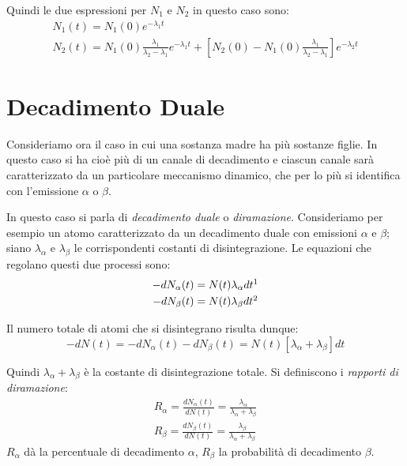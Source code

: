 Quindi le due espressioni per $N_1$ e $N_2$ in questo caso sono:
\begin{gather}
N_1(t)=N_1(0)e^{-\lambda_1t}\\
N_2(t)=N_1(0)\frac{\lambda_1}{\lambda_2-\lambda_1}e^{-\lambda_1t}+[N_2(0)-N_1(0)\frac{\lambda_1}{\lambda_2-\lambda_1}]e^{-\lambda_2t}
\end{gather}
\section{Decadimento Duale}
Consideriamo ora il caso in cui una sostanza madre ha più sostanze figlie.
In questo caso si ha cioè più di un canale di decadimento e ciascun canale sarà caratterizzato da un particolare meccanismo dinamico,
che per lo più si identifica con l'emissione $\alpha$ o $\beta$.

In questo caso si parla di \textit{decadimento duale} o \textit{diramazione}.
Consideriamo per esempio un atomo caratterizzato da un decadimento duale con emissioni $\alpha$ e $\beta$;
siano $\lambda_{\alpha}$ e $\lambda_{\beta}$ le corrispondenti costanti di disintegrazione.
Le equazioni che regolano questi due processi sono:
\begin{gather}
-dN_{\alpha}(t)=N(t)\lambda_{\alpha}dt\footnotemark\\
-dN_{\beta}(t)=N(t)\lambda_{\beta}dt\footnotemark
\end{gather}

\addtocounter{footnote}{-1}

Il numero totale di atomi che si disintegrano risulta dunque:
\begin{equation}
-dN(t)=-dN_{\alpha}(t)-dN_{\beta}(t)=N(t)[\lambda_{\alpha}+\lambda_{\beta}]dt
\end{equation}

Quindi $\lambda_{\alpha}+\lambda_{\beta}$ è la costante di disintegrazione totale. Si definiscono i \textit{rapporti di diramazione}:
\begin{gather}
R_{\alpha}=\frac{dN_{\alpha}(t)}{dN(t)}=\frac{\lambda_{\alpha}}{\lambda_{\alpha}+\lambda_{\beta}}\\
R_{\beta}=\frac{dN_{\beta}(t)}{dN(t)}=\frac{\lambda_{\beta}}{\lambda_{\alpha}+\lambda_{\beta}}
\end{gather}
$R_{\alpha}$ dà la percentuale di decadimento $\alpha$, $R_{\beta}$ la probabilità di decadimento $\beta$.

